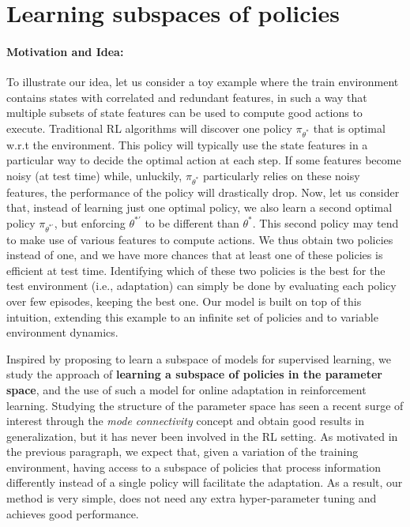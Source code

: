 
\section{Learning subspaces of policies}
\label{sec:model}
\vspace{-0.3cm}
 \paragraph{Motivation and Idea: } To illustrate our idea, let us consider a toy example where the train environment contains states with correlated and redundant features, in such a way that multiple subsets of state features can be used to compute good actions to execute. Traditional RL algorithms will discover one policy $\pi_{\theta^*}$  that is optimal w.r.t the environment. This policy will typically use the state features in a particular way to decide the optimal action at each step. If some  features become noisy (at test time) while, unluckily, $\pi_{\theta^*}$  particularly relies on these noisy features, the performance of the policy will drastically drop. Now, let us consider that, instead of learning just one optimal policy, we also learn a second optimal policy $\pi_{\theta^{*'}}$, but enforcing $\theta^{*'}$ to be different than $\theta^*$. This second policy may tend to make use of various features to compute actions. We thus obtain two policies instead of one, and we have more chances that at least one of these policies is efficient at test time. Identifying which of these two policies is the best for the test environment (i.e., adaptation)  can simply be done by evaluating each policy over few episodes, keeping the best one. Our  model  is built on top of this intuition, extending this example to an infinite set of policies and to variable environment dynamics.
 
 Inspired by \cite{LearningSubspaces}  proposing to learn a subspace of models for supervised learning, we study the approach of  \textbf{learning a subspace of policies in the parameter space}, and the use of such a model for online adaptation in reinforcement learning. Studying the structure of the parameter space has seen a recent surge of interest through the \textit{mode connectivity} concept \citep{BentonMLW21,KuditipudiWLZLH19,LearningSubspaces} and obtain good results in generalization, but it has never been involved in the RL setting. As motivated in the previous paragraph,  we expect that, given a variation of the training environment, having access to a subspace of policies that process information differently instead of a single policy will facilitate the adaptation. As a result, our method is very simple, does not need any extra hyper-parameter tuning and achieves good performance.
  
